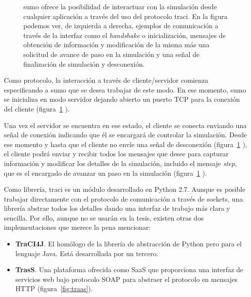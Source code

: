 \begin{figure}[!b]
	\centering
	\caption[Ejemplo de forma de envío de mensajes a través de TraCI]{\gls{sumo} ofrece la posibilidad de interactuar con la simulación desde cualquier aplicación a través del uso del protocolo \gls{traci}. En la figura podemos ver, de izquierda a derecha, ejemplos de comunicación a través de la interfaz como el \textit{handshake} o inicialización, mensajes de obtención de información y modificación de la misma más una solicitud de avance de paso en la simulación y una señal de finalización de simulación y desconexión.}
	\label{fig:traci-messages}
\end{figure}

Como protocolo, la interacción a través de cliente/servidor comienza especificando a \gls{sumo} que se desea trabajar de este modo. En ese momento, \gls{sumo} se inicializa en modo servidor dejando abierto un puerto TCP para la conexión del cliente (figura~\ref{fig:traci-messages} ).

Una vez el servidor se encuentra en ese estado, el cliente se conecta enviando una señal de conexión indicando que él se encargará de controlar la simulación. Desde ese momento y hasta que el cliente no envíe una señal de desconexión (figura~\ref{fig:traci-messages} ), el cliente podrá enviar y recibir todos los mensajes que desee para capturar información y modificar los detalles de la simulación, incluido el mensaje \textit{step}, que es el encargado de avanzar un paso en la simulación (figura~\ref{fig:traci-messages} ).

Como librería, \gls{traci} es un módulo desarrollado en \mbox{Python} $2$.$7$. Aunque es posible trabajar directamente con el protocolo de comunicación a través de sockets, una librería abstrae todos los detalles dando una interfaz de trabajo más clara y sencilla. Por ello, aunque no se usarán en la tesis, existen otras dos implementaciones que merece la pena mencionar:

\begin{itemize}
	\item \textbf{TraCI4J}. El homólogo de la librería de abstracción de Python pero para el lenguaje Java. Está desarrollada por un tercero.
	\item \textbf{TrasS}. Una plataforma ofrecida como SaaS que proporciona una interfaz de servicios web bajo protocolo SOAP para abstraer el protocolo en mensajes HTTP (figura~\ref{fig:traas}).
\end{itemize}

